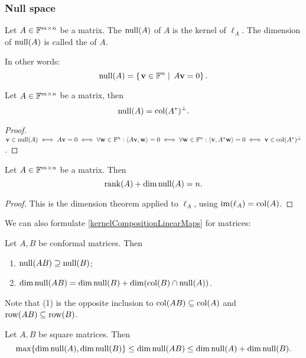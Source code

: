 \subsubsection{Null space}
\begin{definition}
Let $A\in \mathbb{F}^{m\times n}$ be a matrix. The  $\operatorname{null}(A)$ of $A$ is the kernel of $\ell_A$. The dimension of $\operatorname{null}(A)$ is called the  of $A$.
\end{definition}
In other words:
\[ \operatorname{null}(A) = \left\{\left. \boldsymbol{\mathrm{v}}\in \mathbb{F}^n \;\right|\; A\boldsymbol{\mathrm{v}} = 0 \right\}. \]

\begin{proposition}
Let $A\in\mathbb{F}^{m\times n}$ be a matrix, then
\[ \operatorname{null}(A) = \operatorname{col}(A^*)^\perp. \]
\end{proposition}
\begin{proof}
$\boldsymbol{\mathrm{v}}\in\operatorname{null}(A) \iff A\boldsymbol{\mathrm{v}} = 0 \iff \forall \boldsymbol{\mathrm{w}}\in\mathbb{F}^n:\left\langle A\boldsymbol{\mathrm{v}},\boldsymbol{\mathrm{w}} \right\rangle=0 \iff \forall \boldsymbol{\mathrm{w}}\in\mathbb{F}^n: \left\langle \boldsymbol{\mathrm{v}},A^*\boldsymbol{\mathrm{w}} \right\rangle=0 \iff \boldsymbol{\mathrm{v}}\in\operatorname{col}(A^*)^\perp$.
\end{proof}

\begin{lemma} \label{dimensionTheoremMatrices}
Let $A\in \mathbb{F}^{m\times n}$ be a matrix. Then
\[ \operatorname{rank}(A) + \dim\operatorname{null}(A) = n. \]
\end{lemma}
\begin{proof}
This is the dimension theorem applied to $\ell_A$, using $\operatorname{im}(\ell_A) = \operatorname{col}(A)$.
\end{proof}

We can also formulate \ref{kernelCompositionLinearMaps} for matrices:
\begin{proposition} \label{nullSpaceProduct}
Let $A,B$ be conformal matrices. Then
\begin{enumerate}
\item $\operatorname{null}(AB)\supseteq \operatorname{null}(B)$;
\item $\dim\operatorname{null}(AB) = \dim\operatorname{null}(B) + \dim(\operatorname{col}(B)\cap\operatorname{null}(A))$.
\end{enumerate}
\end{proposition}
Note that (1) is the opposite inclusion to $\operatorname{col}(AB)\subseteq \operatorname{col}(A)$ and $\operatorname{row}(AB)\subseteq \operatorname{row}(B)$.
\begin{corollary}
Let $A,B$ be square matrices. Then
\[ \max\{\dim\operatorname{null}(A),\dim\operatorname{null}(B)\} \leq \dim\operatorname{null}(AB) \leq \dim\operatorname{null}(A) + \dim\operatorname{null}(B). \]
\end{corollary}


